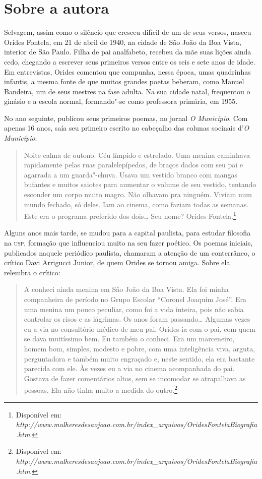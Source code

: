 
\section{Sobre a autora}

Selvagem, assim como o silêncio que cresceu difícil de um de seus
versos, nasceu Orides Fontela, em 21 de abril de 1940, na cidade de São
João da Boa Vista, interior de São Paulo. Filha de pai analfabeto,
recebeu da mãe suas lições ainda cedo, chegando a escrever seus
primeiros versos entre os seis e sete anos de idade. Em entrevistas,
Orides comentou que compunha, nessa época, umas quadrinhas infantis, a
mesma fonte de que muitos grandes poetas beberam, como Manuel Bandeira,
um de seus mestres na fase adulta. Na sua cidade natal, frequentou o
ginásio e a escola normal, formando"-se como professora primária, em
1955.

No ano seguinte, publicou seus primeiros poemas, no jornal \emph{O
Município}. Com apenas 16 anos, saía seu primeiro escrito no cabeçalho das colunas socinais d'\emph{O Município}:

\begin{quote}
Noite calma de outono. Céu límpido e estrelado. Uma menina caminhava rapidamente pelas ruas paralelepípedos, de braços dados com seu pai e agarrada a um guarda"-chuva. Usava um vestido branco com mangas bufantes e muitos saiotes para aumentar o volume de seu vestido, tentando esconder um corpo muito magro. Não olhavam pra ninguém. Viviam num mundo fechado, só deles. Iam ao cinema, como faziam todas as semanas. Este era o programa preferido dos dois\ldots{} Seu nome? Orides Fontela.\footnote{Disponível em: \emph{http://www.mulheresdesaojoao.com.br/index\_arquivos/OridesFontelaBiografia.htm}.}
\end{quote}

Alguns anos mais tarde, se mudou para a capital paulista,
para estudar filosofia na \textsc{usp}, formação que influenciou muito na seu
fazer poético. Os poemas iniciais, publicados naquele periódico
paulista, chamaram a atenção de um conterrâneo, o crítico Davi Arrigucci
Junior, de quem Orides se tornou amiga. Sobre ela relembra o crítico:

\begin{quote}
A conheci ainda menina em São João da Boa Vista. Ela foi minha companheira de período no Grupo Escolar ``Coronel Joaquim José''. Era uma menina um pouco peculiar, como foi a vida inteira, pois não sabia controlar os risos e as lágrimas. Os anos foram passando\ldots{} Algumas vezes eu a via no consultório médico de meu pai. Orides ia com o pai, com quem se dava muitíssimo bem. Eu também o conheci. Era um marceneiro, homem bom, simples, modesto e pobre, com uma inteligência viva, arguta, perguntadora e também muito engraçado e, neste sentido, ela era bastante parecida com ele. Às vezes eu a via no cinema acompanhada do pai. Gostava de fazer comentários altos, sem se incomodar se atrapalhava as pessoas. Ela não tinha muito a medida do outro.\footnote{Disponível em: \emph{http://www.mulheresdesaojoao.com.br/index\_arquivos/OridesFontelaBiografia.htm}.}
\end{quote}


